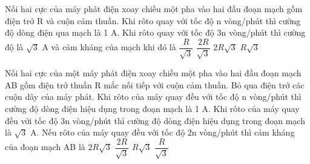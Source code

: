 \begin{vidu} %
	Nối hai cực của máy phát điện xoay chiều một pha vào hai đầu đoạn mạch gồm điện trở R và cuộn cảm thuần. Khi rôto quay với tốc độ n vòng/phút thì cường độ dòng điện qua mạch là 1 A. Khi rôto quay với tốc độ 3n vòng/phút thì cường độ là $\sqrt{3}$ A và cảm kháng của mạch khi đó là
	\choice
	{$\dfrac{R}{\sqrt{3}}$}
	{$\dfrac{2R}{\sqrt{3}}$}
	{$2R\sqrt{3}$}
	{\True $R\sqrt{3}$}
\end{vidu}
\begin{vidu*} %
	 Nối hai cực của một máy phát điện xoay chiều một pha vào hai đầu đoạn mạch AB gồm điện trở thuần R mắc nối tiếp với cuộn cảm thuần. Bỏ qua điện trở các cuộn dây của máy phát. Khi rôto của máy quay đều với tốc độ n vòng/phút thì cường độ dòng điện hiệu dụng trong đoạn mạch là 1 A. Khi rôto của máy quay đều với tốc độ 3n vòng/phút thì cường độ dòng điện hiệu dụng trong đoạn mạch là $\sqrt{3}$ A. Nếu rôto của máy quay đều với tốc độ 2n vòng/phút thì cảm kháng của đoạn mạch AB là
	\choice
	{$2R \sqrt{3}$}
	{\True $\dfrac{2R}{\sqrt{3}}$}
	{$R \sqrt{3}$}
	{$\dfrac{R}{\sqrt{3}}$}
\end{vidu*}
